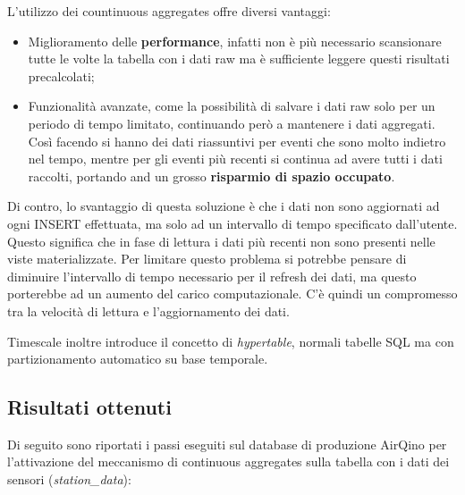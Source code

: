 L’utilizzo dei countinuous aggregates offre diversi vantaggi:
\begin{itemize}
  \item Miglioramento delle \textbf{performance}, infatti non è più necessario scansionare tutte le volte la tabella con i dati raw ma è sufficiente leggere questi risultati precalcolati;
  \item Funzionalità avanzate, come la possibilità di salvare i dati raw solo per un periodo di tempo limitato, continuando però a mantenere i dati aggregati. Così facendo si hanno dei dati riassuntivi per eventi che sono molto indietro nel tempo, mentre per gli eventi più recenti si continua ad avere tutti i dati raccolti, portando and un grosso \textbf{risparmio di spazio occupato}.
\end{itemize}

Di contro, lo svantaggio di questa soluzione è che i dati non sono aggiornati ad ogni INSERT effettuata, ma solo ad un intervallo di tempo specificato dall’utente. Questo significa che in fase di lettura i dati più recenti non sono presenti nelle viste materializzate. Per limitare questo problema si potrebbe pensare di diminuire l’intervallo di tempo necessario per il refresh dei dati, ma questo porterebbe ad un aumento del carico computazionale. C'è quindi un compromesso tra la velocità di lettura e l’aggiornamento dei dati. \cite{tesi_polito_2}

Timescale inoltre introduce il concetto di \textit{hypertable}, normali tabelle SQL ma con partizionamento automatico su base temporale.

\subsection{Risultati ottenuti}\label{ssec:cont-aggr-risultati}
Di seguito sono riportati i passi eseguiti sul database di produzione AirQino per l'attivazione del meccanismo di continuous aggregates sulla tabella con i dati dei sensori (\textit{station\_data}):

